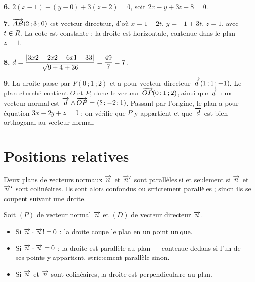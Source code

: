 \begin{corrige}
\textbf{6.} $2(x-1)-(y-0)+3(z-2) = 0$, soit $2x-y+3z-8 = 0$.

\textbf{7.} $\overrightarrow{AB}(2\,;3\,;0)$ est vecteur directeur, d'où
$x = 1+2t$, $y = -1+3t$, $z = 1$, avec $t \in R$. La cote est constante : la
droite est horizontale, contenue dans le plan $z = 1$.

\textbf{8.} $d = \dfrac{\left|3x2+2x2+6x1+33\right|}{\sqrt{9+4+36}}
= \dfrac{49}{7} = 7$.

\textbf{9.} La droite passe par $P(0\,;1\,;2)$ et a pour vecteur directeur
$\overrightarrow{d}(1\,;1\,;-1)$. Le plan cherché contient $O$ et $P$, donc le vecteur
$\overrightarrow{OP}(0\,;1\,;2)$, ainsi que $\overrightarrow{d}$ : un vecteur normal est
$\overrightarrow{d} \wedge \overrightarrow{OP} = (3\,;-2\,;1)$. Passant par l'origine, le plan a
pour équation $3x-2y+z = 0$ ; on vérifie que $P$ y appartient et que $\overrightarrow{d}$
est bien orthogonal au vecteur normal.
\end{corrige}

\section{Positions relatives}

\begin{propriete}
Deux plans de vecteurs normaux $\overrightarrow{n}$ et $\overrightarrow{n}'$ sont parallèles si et
seulement si $\overrightarrow{n}$ et $\overrightarrow{n}'$ sont colinéaires. Ils sont alors confondus ou
strictement parallèles ; sinon ils se coupent suivant une droite.
\end{propriete}

\begin{propriete}
Soit $(P)$ de vecteur normal $\overrightarrow{n}$ et $(D)$ de vecteur directeur $\overrightarrow{u}$.
\begin{itemize}[leftmargin=*, itemsep=0.1em]
  \item Si $\overrightarrow{n} \cdot \overrightarrow{u} != 0$ : la droite coupe le plan en un point
        unique.
  \item Si $\overrightarrow{n} \cdot \overrightarrow{u} = 0$ : la droite est parallèle au plan —
        contenue dedans si l'un de ses points y appartient, strictement
        parallèle sinon.
  \item Si $\overrightarrow{u}$ et $\overrightarrow{n}$ sont colinéaires, la droite est perpendiculaire
        au plan.
\end{itemize}
\end{propriete}


